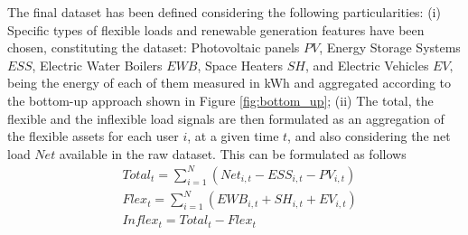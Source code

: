 \begin{table}[htbp]
\centering
{}
\label{table:dataport_austin}
\end{table}

The final dataset has been defined considering the following particularities: (i) Specific types of flexible loads and renewable generation features have been chosen, constituting the dataset: Photovoltaic panels $PV$, Energy Storage Systems $ESS$, Electric Water Boilers $EWB$, Space Heaters $SH$, and Electric Vehicles $EV,$ being the energy of each of them measured in kWh and aggregated according to the bottom-up approach shown in Figure \ref{fig:bottom_up}; (ii) The total, the flexible and the inflexible load signals are then formulated as an aggregation of the flexible assets for each user $i$, at a given time $t$, and also considering the net load $Net$ available in the raw dataset. This can be formulated as follows 
\begin{subequations}
\begin{align} 
  & Total_{t} = \sum_{i=1}^{N} (Net_{i,t} - ESS_{i,t} - PV_{i,t}) \\
  & Flex_{t} = \sum_{i=1}^{N} (EWB_{i,t} +  SH_{i,t} + EV_{i,t}) \\
  & Inflex_{t} = Total_{t} - Flex_{t}
\end{align}
\end{subequations}

